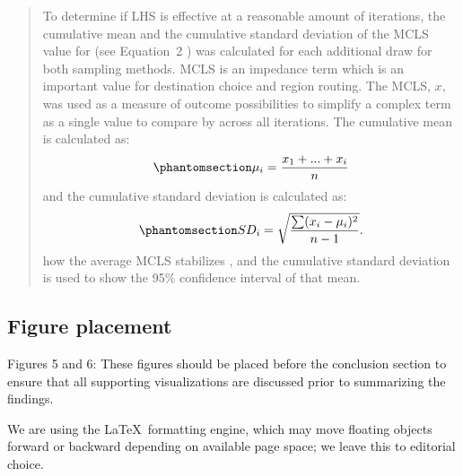 \documentclass{ar2rc}
\begin{document}
\begin{quote}
    \setcounter{equation}{4}
    To determine if LHS is effective at a reasonable amount of iterations,
the cumulative mean and the cumulative standard deviation of the \DIFdelbegin {}\DIFdelend \DIFaddbegin {}\DIFaddend MCLS value for \DIFdelbegin {}\DIFdelend \DIFaddbegin {}\DIFaddend (see Equation~2 ) was calculated
for each additional draw for both sampling methods. MCLS is an impedance
term which is an important value for destination choice and region
routing. The \DIFdelbegin {}\DIFdelend \DIFaddbegin {}\DIFaddend MCLS, \(x\), was used as a measure of outcome
possibilities to simplify a complex term as a single value to compare by
across all iterations. The cumulative mean is calculated as:
\begin{equation}\phantomsection\label{eq-cmclsmean}{
\mu_i = \frac{x_1 + ... + x_i}{n}
}\end{equation} and the cumulative standard deviation is calculated as:
\begin{equation}\phantomsection\label{eq-sdi}{
SD_i = \sqrt{\frac{\sum (x_i - \mu_i)^2 }{n-1}}.
}\end{equation}  \DIFdelbegin {}\DIFdelend \DIFaddbegin {}\DIFaddend how the average MCLS
stabilizes \DIFdelbegin {}\DIFdelend \DIFaddbegin {}\DIFaddend , and the cumulative standard deviation
is used to show the 95\% confidence interval of that mean. 
\DIFdelbegin {}\DIFdelend 

    
\end{quote}

\subsection{Figure placement}
\RC Figures 5 and 6: These figures should be placed before the conclusion section to ensure that all
supporting visualizations are discussed prior to summarizing the findings.

\AR We are using the \LaTeX\  formatting engine, which may move floating objects forward or backward 
depending on available page space; we leave this to editorial choice.
\end{document}
